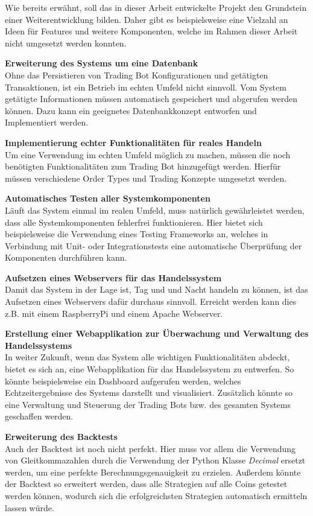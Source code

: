 \documentclass[oneside]{ausarbeitung}
\begin{document}
Wie bereits erwähnt, soll das in dieser Arbeit entwickelte Projekt den Grundstein einer Weiterentwicklung bilden. Daher gibt es beispielsweise eine Vielzahl an Ideen für Features und weitere Komponenten, welche im Rahmen dieser Arbeit nicht umgesetzt werden konnten.

\textbf{Erweiterung des Systems um eine Datenbank} \\
Ohne das Persistieren von Trading Bot Konfigurationen und getätigten Transaktionen, ist ein Betrieb im echten Umfeld nicht sinnvoll. Vom System getätigte Informationen müssen automatisch gespeichert und abgerufen werden können. Dazu kann ein geeignetes Datenbankkonzept entworfen und Implementiert werden.

\textbf{Implementierung echter Funktionalitäten für reales Handeln} \\
Um eine Verwendung im echten Umfeld möglich zu machen, müssen die noch benötigten Funktionalitäten zum Trading Bot hinzugefügt werden. Hierfür müssen verschiedene Order Types und Trading Konzepte umgesetzt werden.

\textbf{Automatisches Testen aller Systemkomponenten} \\
Läuft das System einmal im realen Umfeld, muss natürlich gewährleistet werden, dass alle Systemkomponenten fehlerfrei funktionieren. Hier bietet sich beispielsweise die Verwendung eines Testing Frameworks an, welches in Verbindung mit Unit- oder Integrationstests eine automatische Überprüfung der Komponenten durchführen kann.

\textbf{Aufsetzen eines Webservers für das Handelssystem} \\
Damit das System in der Lage ist, Tag und und Nacht handeln zu können, ist das Aufsetzen eines Webservers dafür durchaus sinnvoll. Erreicht werden kann dies z.B. mit einem RaspberryPi und einem Apache Webserver.

\textbf{Erstellung einer Webapplikation zur Überwachung und Verwaltung des Handelssystems} \\
In weiter Zukunft, wenn das System alle wichtigen Funktionalitäten abdeckt, bietet es sich an, eine Webapplikation für das Handelssystem zu entwerfen. So könnte beispielsweise ein Dashboard aufgerufen werden, welches Echtzeitergebnisse des Systems darstellt und visualisiert. Zusätzlich könnte so eine Verwaltung und Steuerung der Trading Bots bzw. des gesamten Systems geschaffen werden.

\textbf{Erweiterung des Backtests} \\
Auch der Backtest ist noch nicht perfekt. Hier muss vor allem die Verwendung von Gleitkommazahlen durch die Verwendung der Python Klasse \textit{Decimal} ersetzt werden, um eine perfekte Berechnungsgenauigkeit zu erzielen. Außerdem könnte der Backtest so erweitert werden, dass alle Strategien auf alle Coins getestet werden können, wodurch sich die erfolgreichsten Strategien automatisch ermitteln lassen würde.
\appendix
\end{document}
